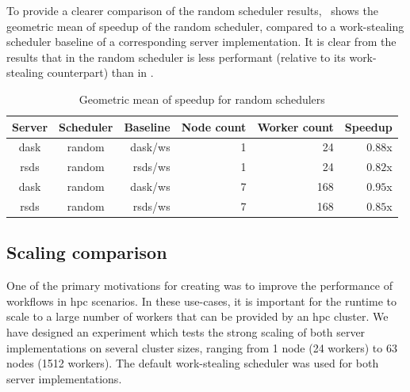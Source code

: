 To provide a clearer comparison of the random scheduler results,~ shows
the geometric mean of speedup of the random scheduler, compared to a work-stealing scheduler
baseline of a corresponding server implementation. It is clear from the results that in
\rsds{} the random scheduler is less performant (relative to its work-stealing
counterpart) than in \dask{}.

\setlength{\tabcolsep}{5pt}
\begin{table}
	\centering
	\begin{tabular}{c|c|r|r|r|r}
		\textbf{Server}      & \textbf{Scheduler} & \textbf{Baseline} & \textbf{Node count} &
		\textbf{Worker	count} & \textbf{Speedup}                                                   \\
		\midrule
		dask                 & random             & dask/ws           & 1                   & 24
		                     & $0.88$x                                                       \\
		rsds                 & random             & rsds/ws           & 1                   & 24
		                     & $0.82$x                                                       \\
		dask                 & random             & dask/ws           & 7                   & 168
		                     & $0.95$x                                                       \\
		rsds                 & random             & rsds/ws           & 7                   & 168
		                     & $0.85$x                                                       \\
	\end{tabular}
	\caption{Geometric mean of speedup for random schedulers}
	\label{tab:rsds-random-geom-mean-speedup}
\end{table}

\subsection*{Scaling comparison}
One of the primary motivations for creating \rsds{} was to improve the
performance of \dask{} workflows in \gls{hpc} scenarios. In
these use-cases, it is important for the runtime to scale to a large number of workers that can be
provided by an \gls{hpc} cluster. We have designed an experiment which tests the
strong scaling of both server implementations on several cluster sizes, ranging from
\num{1} node (\num{24} workers) to \num{63}
nodes (\num{1512} workers). The default work-stealing scheduler was used for both
server implementations.

